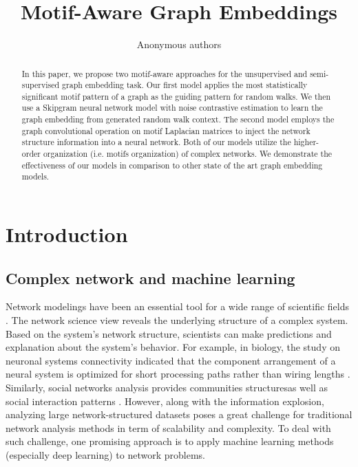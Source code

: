 \documentclass{article}
\title{Motif-Aware Graph Embeddings}
\author{Anonymous authors}
\theoremstyle{definition}
\begin{document}
\maketitle

\begin{abstract}
  In this paper, we propose two motif-aware approaches for the 
  unsupervised and semi-supervised graph embedding task. Our first model 
  applies the most statistically significant motif pattern of a graph as 
  the guiding pattern for random walks. We then use a Skipgram neural 
  network model with noise contrastive estimation to learn the graph 
  embedding from generated random walk context. The second model employs 
  the graph convolutional operation on motif Laplacian matrices to inject 
  the network structure information into a neural network. Both of our 
  models utilize the higher-order organization (i.e. motifs organization) 
  of complex networks. We demonstrate the effectiveness of our models in 
  comparison to other state of the art graph embedding models.
\end{abstract}

\section{Introduction}

\subsection{Complex network and machine learning}

Network modelings have been an essential tool for a wide
range of scientific fields
\cite{physicnet,molecule,youtube,motifblockmilo,juremotif}.
The network science view reveals the underlying structure 
of a complex system. Based on the system's network structure, 
scientists can make predictions and explanation
about the system's behavior. For example, in biology, the
study on neuronal systems connectivity indicated
that the component arrangement of a neural system is optimized
for short processing paths rather than wiring lengths
\cite{kaiser2006nonoptimal}. Similarly, social networks 
analysis provides communities structuresas well as 
social interaction patterns 
\cite{west2014exploiting,barabasi2014network}. 
However, along with the information explosion, analyzing
large network-structured datasets poses a great challenge 
for traditional network analysis methods in term of 
scalability and complexity. To deal with such challenge,
one promising approach is to apply machine learning methods 
(especially deep learning) to network problems.
\end{document}
